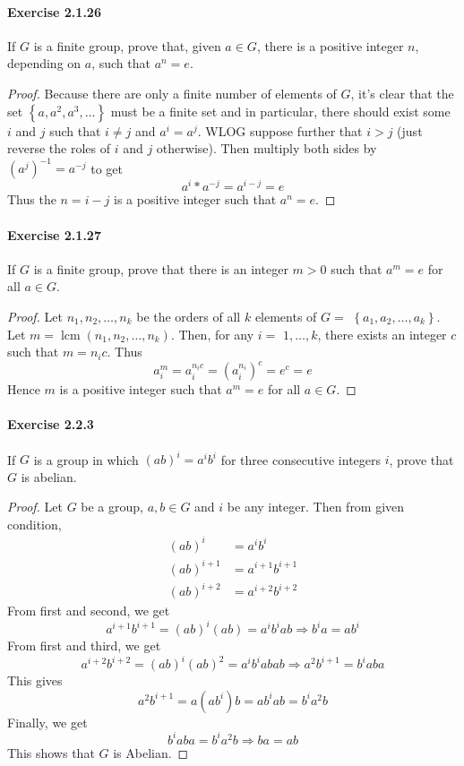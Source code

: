 \documentclass{article}
\begin{document}
\paragraph{Exercise 2.1.26} If $G$ is a finite group, prove that, given $a \in G$, there is a positive integer $n$, depending on $a$, such that $a^n = e$.
\begin{proof}
    Because there are only a finite number of elements of $G$, it's clear that the set $\left\{a, a^2, a^3, \ldots\right\}$ must be a finite set and in particular, there should exist some $i$ and $j$ such that $i \neq j$ and $a^i=a^j$. WLOG suppose further that $i>j$ (just reverse the roles of $i$ and $j$ otherwise). Then multiply both sides by $\left(a^j\right)^{-1}=a^{-j}$ to get
$$
a^i * a^{-j}=a^{i-j}=e
$$
Thus the $n=i-j$ is a positive integer such that $a^n=e$.
\end{proof}


\paragraph{Exercise 2.1.27} If $G$ is a finite group, prove that there is an integer $m > 0$ such that $a^m = e$ for all $a \in G$.
\begin{proof}
    Let $n_1, n_2, \ldots, n_k$ be the orders of all $k$ elements of $G=$ $\left\{a_1, a_2, \ldots, a_k\right\}$. Let $m=\operatorname{lcm}\left(n_1, n_2, \ldots, n_k\right)$. Then, for any $i=$ $1, \ldots, k$, there exists an integer $c$ such that $m=n_i c$. Thus
$$
a_i^m=a_i^{n_i c}=\left(a_i^{n_i}\right)^c=e^c=e
$$
Hence $m$ is a positive integer such that $a^m=e$ for all $a \in G$.
\end{proof}


\paragraph{Exercise 2.2.3} If $G$ is a group in which $(a b)^{i}=a^{i} b^{i}$ for three consecutive integers $i$, prove that $G$ is abelian.
\begin{proof}
    Let $G$ be a group, $a, b \in G$ and $i$ be any integer. Then from given condition,
$$
\begin{aligned}
(a b)^i & =a^i b^i \\
(a b)^{i+1} & =a^{i+1} b^{i+1} \\
(a b)^{i+2} & =a^{i+2} b^{i+2}
\end{aligned}
$$
From first and second, we get
$$
a^{i+1} b^{i+1}=(a b)^i(a b)=a^i b^i a b \Longrightarrow b^i a=a b^i
$$
From first and third, we get
$$
a^{i+2} b^{i+2}=(a b)^i(a b)^2=a^i b^i a b a b \Longrightarrow a^2 b^{i+1}=b^i a b a
$$
This gives
$$
a^2 b^{i+1}=a\left(a b^i\right) b=a b^i a b=b^i a^2 b
$$
Finally, we get
$$
b^i a b a=b^i a^2 b \Longrightarrow b a=a b
$$
This shows that $G$ is Abelian.
\end{proof}
\end{document}
